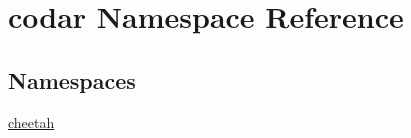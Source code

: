 \hypertarget{namespacecodar}{}\section{codar Namespace Reference}
\label{namespacecodar}
\subsection*{Namespaces}
\begin{DoxyCompactItemize}
\item 
 \hyperlink{namespacecodar_1_1cheetah}{cheetah}
\end{DoxyCompactItemize}
